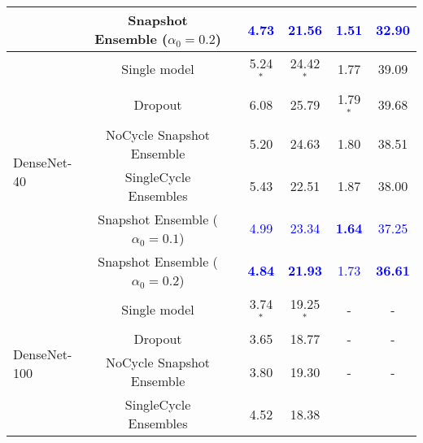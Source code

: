 \begin{table*}[t]
\begin{tabular}{lcccccc}
&  Snapshot Ensemble ($\alpha_0=0.2$) &  &  \textcolor{blue}{4.73} &  \textcolor{blue}{21.56} &  \textcolor{blue}{{\bf 1.51}} & \textcolor{blue}{{\bf 32.90}}\\
\midrule
\multirow{6}{*}{{ DenseNet-40}} &  Single model &   &  5.24$^*$ &  24.42$^*$ & 1.77 & 39.09 \\
&  Dropout &  &  6.08 &  25.79 & 1.79$^*$ & 39.68 \\
&  NoCycle Snapshot Ensemble &  &  5.20 &  24.63  & 1.80 & 38.51 \\
&  SingleCycle Ensembles & & 5.43 & 22.51  & 1.87 & 38.00  \\
&  Snapshot Ensemble ($\alpha_0=0.1$) &  &  \textcolor{blue}{4.99} &  \textcolor{blue}{23.34}  & \textcolor{blue}{{\bf 1.64}}  & \textcolor{blue}{37.25} \\
&  Snapshot Ensemble ($\alpha_0=0.2$) &  &  \textcolor{blue}{{\bf 4.84}} &  \textcolor{blue}{{\bf 21.93}}  & \textcolor{blue}{1.73}& \textcolor{blue}{{\bf 36.61}} \\
\midrule
\multirow{6}{*}{{ DenseNet-100}}  &  Single model &  &  3.74$^*$ &  19.25$^*$ & - & - \\
&  Dropout &  &  3.65 &  18.77 & - & - \\
&  NoCycle Snapshot Ensemble & &  3.80  &  19.30  & - & -\\
&  SingleCycle Ensembles  & & 4.52 & 18.38  &  &  \\


\end{tabular}
\end{table*}
